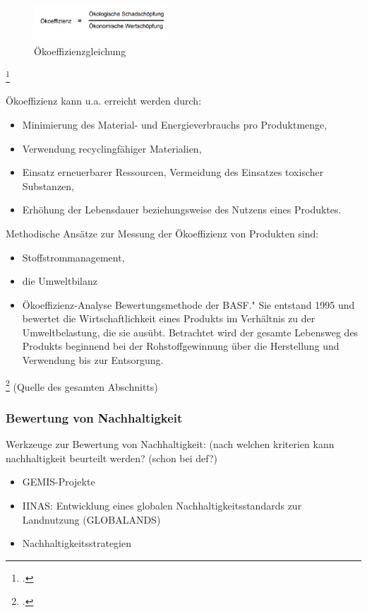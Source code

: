 \documentclass{article}
\begin{document}
\begin{figure}[h]
\centering
\includegraphics[width=5cm]{image_folder/oekoeffizienz.png}
\caption{Ökoeffizienzgleichung}
\label{fig:Ökoeffizienzgleichung}
\end{figure}\footcite{Essel2010AnalyseFazit}


Ökoeffizienz kann u.a. erreicht werden durch:
\begin{itemize}
\item Minimierung des Material- und Energieverbrauchs pro Produktmenge,
\item Verwendung recyclingfähiger Materialien,
\item Einsatz erneuerbarer Ressourcen, Vermeidung des Einsatzes toxischer Substanzen,
\item Erhöhung der Lebensdauer beziehungsweise des Nutzens eines Produktes.
\end{itemize}

Methodische Ansätze zur Messung der Ökoeffizienz von Produkten sind:
\begin{itemize}
\item Stoffstrommanagement,
\item die Umweltbilanz
\item Ökoeffizienz-Analyse Bewertungsmethode der BASF." Sie entstand 1995 und bewertet die Wirtschaftlichkeit eines Produkts im Verhältnis zu der Umweltbelastung, die sie ausübt. Betrachtet wird der gesamte Lebensweg des Produkts beginnend bei der Rohstoffgewinnung über die Herstellung und Verwendung bis zur Entsorgung.
\end{itemize}
\footcite{DefinitionWirtschaftslexikonc} (Quelle des gesamten Abschnitts)

\subsubsection{Bewertung von Nachhaltigkeit}
Werkzeuge zur Bewertung von Nachhaltigkeit: (nach welchen kriterien kann nachhaltigkeit beurteilt werden? (schon bei def?)

\begin{itemize}
-Analyse Bewertung von Nachhaltigkeit mit der -Analyse und SEEBALANCE®
\item GEMIS-Projekte
\item IINAS: Entwicklung eines globalen Nachhaltigkeitsstandards zur Landnutzung (GLOBALANDS)
\item Nachhaltigkeitsstrategien
\end{itemize}
\end{document}
